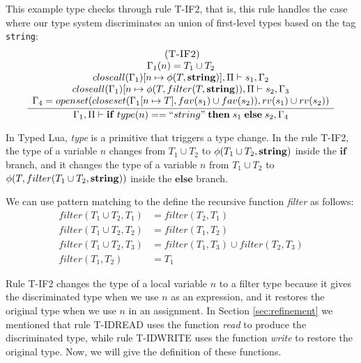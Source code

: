 This example type checks through rule \textsc{T-IF2}, that is,
this rule handles the case where our type system discriminates
an union of first-level types based on the tag \texttt{string}:
\[
\begin{array}{c}
\; (\textsc{T-IF2})\\
\dfrac{\begin{array}{c}
       \Gamma_{1}(n) = T_{1} \cup T_{2}\\
       closeall(\Gamma_{1})[n \mapsto \phi(T,\mathbf{string})], \Pi \vdash s_{1}, \Gamma_{2} \\
       closeall(\Gamma_{1})[n \mapsto \phi(T,filter(T, \mathbf{string})), \Pi \vdash s_{2}, \Gamma_{3}\\
       \Gamma_{4} = openset(closeset(\Gamma_{1}[n \mapsto T], fav(s_{1}) \cup fav(s_{2})),rv(s_{1}) \cup rv(s_{2}))
      \end{array}}
      {\Gamma_{1}, \Pi \vdash \mathbf{if} \; type(n) == ``string" \; \mathbf{then} \; s_{1} \; \mathbf{else} \; s_{2}, \Gamma_{4}}
\end{array}
\]

In Typed Lua, \emph{type} is a primitive that triggers a type change.
In the rule \textsc{T-IF2}, the type of a variable $n$ changes from
$T_{1} \cup T_{2}$ to $\phi(T_{1} \cup T_{2},\mathbf{string})$ inside the
$\mathbf{if}$ branch, and it changes the type of a variable $n$ from
$T_{1} \cup T_{2}$ to $\phi(T,filter(T_{1} \cup T_{2},\mathbf{string}))$
inside the $\mathbf{else}$ branch.

We can use pattern matching to the define the recursive function
\emph{filter} as follows:
\begin{align*}
filter(T_{1} \cup T_{2}, T_{1}) & = filter(T_{2}, T_{1})\\
filter(T_{1} \cup T_{2}, T_{2}) & = filter(T_{1}, T_{2})\\
filter(T_{1} \cup T_{2}, T_{3}) & = filter(T_{1}, T_{3}) \cup filter(T_{2}, T_{3})\\
filter(T_{1}, T_{2}) & = T_{1}
\end{align*}

Rule \textsc{T-IF2} changes the type of a local variable $n$ to a
filter type because it gives the discriminated type when we use $n$ as
an expression, and it restores the original type when we use $n$
in an assignment.
In Section \ref{sec:refinement} we mentioned that rule \textsc{T-IDREAD}
uses the function \emph{read} to produce the discriminated type,
while rule \textsc{T-IDWRITE} uses the function \emph{write} to
restore the original type.
Now, we will give the definition of these functions.

